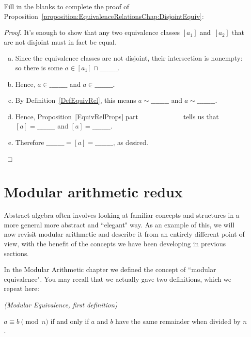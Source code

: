 \begin{exercise}\label{exercise:EquivalenceRelationsChap:DisjointEquivEx}
Fill in the blanks to complete the proof of Proposition~\ref{proposition:EquivalenceRelationsChap:DisjointEquiv}:

\begin{proof}
It's enough to show that any two equivalence classes $[a_1]$ and~$[a_2]$ that are not disjoint must in fact be equal. 
\begin{enumerate}[(a)]
\item
Since the equivalence classes are not disjoint, their intersection is nonempty: so there is some $a \in [a_1] \cap \_\_\_\_\_\_\_\_$. 
\item
Hence, $a \in \_\_\_\_\_\_\_\_$ and $a \in \_\_\_\_\_\_\_\_$. 
\item
By Definition~\ref{DefEquivRel}, this means $a \sim \_\_\_\_\_\_\_\_$ and $a \sim \_\_\_\_\_\_\_\_$. 
\item
Hence, Proposition~\ref{EquivRelProps} part \_\_\_\_\_\_\_\_  tells us that $[a] =\_\_\_\_\_\_\_\_$ and $[a] =\_\_\_\_\_\_\_\_$. 
\item
Therefore $\_\_\_\_\_\_\_\_ = [a] = \_\_\_\_\_\_\_\_$, as desired.
\end{enumerate}
\end{proof}
\end{exercise}


\section{Modular arithmetic redux} \label{EquivalenceRelationsModArithSect}

Abstract algebra often involves looking at familiar concepts and structures in a more general more abstract and ``elegant" way. As an example of this, we will now revisit modular arithmetic and describe it from an entirely different point of view, with the benefit of the concepts we have been developing in previous sections.

In the Modular Arithmetic chapter we defined the concept of ``modular equivalence".  You may recall that we actually gave two definitions, which we repeat here: 

\begin{defn}\label{mod_eqiv_def_1} \emph{(Modular Equivalence, first definition)}

\medskip
$a \equiv b \pmod{n}$ if and only if $a$ and $b$ have the same remainder when divided by $n$.
\end{defn}



